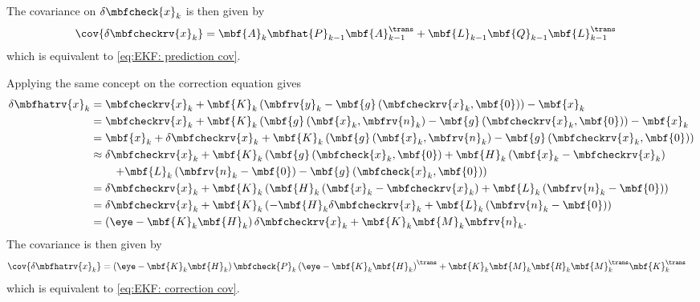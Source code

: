 \documentclass[nobib]{tufte-handout}
\begin{document}
    The covariance on $\delta\mbfcheck{x}_{k}$ is then given by
    \begin{align}
        \cov{\delta\mbfcheckrv{x}_{k}} &= \mbf{A}_{k}\mbfhat{P}_{k-1}\mbf{A}_{k-1}^{\trans} + \mbf{L}_{k-1}\mbf{Q}_{k-1}\mbf{L}_{k-1}^{\trans}
    \end{align}
    which is equivalent to \eqref{eq:EKF: prediction cov}.

    Applying the same concept on the correction equation gives
    \begin{align}
        \delta\mbfhatrv{x}_{k} 
        &= \mbfcheckrv{x}_{k} + \mbf{K}_{k}\left( \mbfrv{y}_{k} - \mbf{g}\left( \mbfcheckrv{x}_{k}, \mbf{0} \right) \right) - \mbf{x}_{k}\\
        &= \mbfcheckrv{x}_{k} + \mbf{K}_{k}\left( \mbf{g}\left( \mbf{x}_{k},\mbfrv{n}_{k} \right) - \mbf{g}\left( \mbfcheckrv{x}_{k}, \mbf{0} \right) \right) - \mbf{x}_{k}\\
        &= \mbf{x}_{k} + \delta\mbfcheckrv{x}_{k} + \mbf{K}_{k}\left( \mbf{g}\left( \mbf{x}_{k},\mbfrv{n}_{k} \right) - \mbf{g}\left( \mbfcheckrv{x}_{k}, \mbf{0} \right) \right)\\
        &\approx \delta\mbfcheckrv{x}_{k} +\mbf{K}_{k}\left( \mbf{g}\left( \mbfcheck{x}_{k}, \mbf{0} \right) + \mbf{H}_{k}\left( \mbf{x}_{k} - \mbfcheckrv{x}_{k} \right) \right.\nonumber\\&\qquad \left.+ \mbf{L}_{k}\left( \mbfrv{n}_{k}-\mbf{0} \right) - \mbf{g}\left( \mbfcheck{x}_{k},\mbf{0} \right) \right)\\
        &= \delta\mbfcheckrv{x}_{k} +\mbf{K}_{k}\left( \mbf{H}_{k}\left( \mbf{x}_{k} - \mbfcheckrv{x}_{k} \right) + \mbf{L}_{k}\left( \mbfrv{n}_{k}-\mbf{0} \right) \right)\\
        &= \delta\mbfcheckrv{x}_{k} +\mbf{K}_{k}\left( -\mbf{H}_{k}\delta\mbfcheckrv{x}_{k} + \mbf{L}_{k}\left( \mbfrv{n}_{k}-\mbf{0} \right) \right)\\
        &= \left( \eye - \mbf{K}_{k}\mbf{H}_{k} \right)\delta\mbfcheckrv{x}_{k} + \mbf{K}_{k}\mbf{M}_{k}\mbfrv{n}_{k}.
    \end{align}
    The covariance is then given by
    \begin{align}
        \cov{\delta\mbfhatrv{x}_{k}} &= \left( \eye - \mbf{K}_{k}\mbf{H}_{k} \right)\mbfcheck{P}_{k}\left( \eye - \mbf{K}_{k}\mbf{H}_{k} \right)^{\trans} + \mbf{K}_{k}\mbf{M}_{k}\mbf{R}_{k}\mbf{M}_{k}^{\trans}\mbf{K}_{k}^{\trans}
    \end{align}
    which is equivalent to \eqref{eq:EKF: correction cov}.
\end{document}

